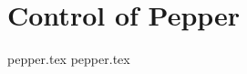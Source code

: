 \part{Control of Pepper}\label{part.pepper}
\begin{refsection}

{pepper.tex}
{pepper.tex}

\printbibliography[heading=bibintoc, title=Bibliography]
\end{refsection}
